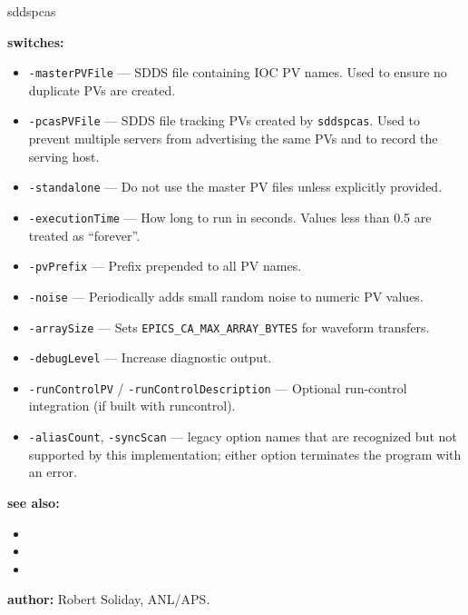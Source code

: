 \begin{sddsprog}{sddspcas}
\item \textbf{switches:}
\begin{itemize}
  \item {\tt -masterPVFile} --- SDDS file containing IOC PV names. Used to ensure no duplicate PVs are created.
  \item {\tt -pcasPVFile} --- SDDS file tracking PVs created by \verb+sddspcas+. Used to prevent multiple servers
        from advertising the same PVs and to record the serving host.
  \item {\tt -standalone} --- Do not use the master PV files unless explicitly provided.
  \item {\tt -executionTime} --- How long to run in seconds. Values less than 0.5 are treated as ``forever''.
  \item {\tt -pvPrefix} --- Prefix prepended to all PV names.
  \item {\tt -noise} --- Periodically adds small random noise to numeric PV values.
  \item {\tt -arraySize} --- Sets \verb+EPICS_CA_MAX_ARRAY_BYTES+ for waveform transfers.
  \item {\tt -debugLevel} --- Increase diagnostic output.
  \item {\tt -runControlPV} / {\tt -runControlDescription} --- Optional run-control integration (if built with runcontrol).
  \item {\tt -aliasCount}, {\tt -syncScan} --- legacy option names that are
        recognized but not supported by this implementation; either option
        terminates the program with an error.
\end{itemize}

\item \textbf{see also:}
\begin{itemize}
  \item {}
  \item {}
  \item {}
\end{itemize}

\item \textbf{author:} Robert Soliday, ANL/APS.
\end{sddsprog}
